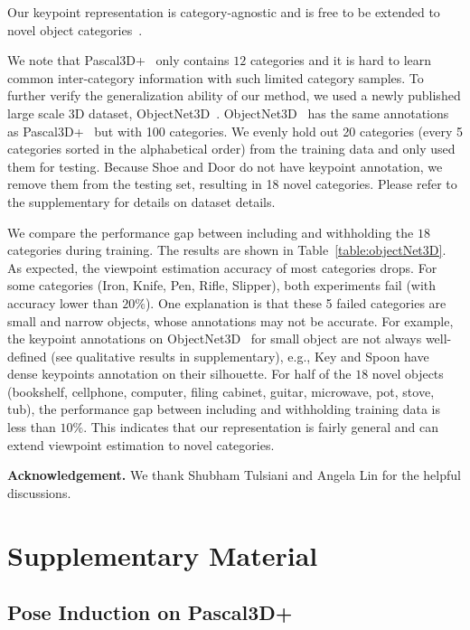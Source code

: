 \documentclass[runningheads]{llncs}
\begin{document}
Our keypoint representation is category-agnostic and is free to be extended to novel object categories~\cite{tulsiani2015pose}.

We note that Pascal3D+~\cite{xiang2014beyond} only contains $12$ categories and it is hard to learn common inter-category information with such limited category samples. 
To further verify the generalization ability of our method, we used a newly published large scale 3D dataset, ObjectNet3D~\cite{xiang2016objectnet3d}.
ObjectNet3D~\cite{xiang2016objectnet3d} has the same annotations as Pascal3D+~\cite{xiang2014beyond} but with 100 categories.
We evenly hold out 20 categories (every 5 categories sorted in the alphabetical order) from the training data and only used them for testing. Because Shoe and Door do not have keypoint annotation, we remove them from the testing set, resulting in 18 novel categories. Please refer to the supplementary for details on dataset details.


We compare the performance gap between including and withholding the $18$ categories during training. 
The results are shown in Table~\ref{table:objectNet3D}. 
As expected, the viewpoint estimation accuracy of most categories drops.
For some categories (Iron, Knife, Pen, Rifle, Slipper), both experiments fail (with accuracy lower than $20\%$). One explanation is that these 5 failed categories are small and narrow objects, whose annotations may not be accurate. For example, the keypoint annotations on ObjectNet3D~\cite{xiang2016objectnet3d} for small object are not always well-defined (see qualitative results in supplementary),
e.g., Key and Spoon have dense keypoints annotation on their silhouette.
For half of the $18$ novel objects (bookshelf, cellphone, computer, filing cabinet, guitar, microwave, pot, stove, tub), the performance gap between including and withholding training data is less than $10\%$.
This indicates that our representation is fairly general and can extend viewpoint estimation to novel categories.

 \noindent\textbf{Acknowledgement.} We thank Shubham Tulsiani and Angela Lin for the helpful discussions.  



\clearpage
\section{Supplementary Material}

\subsection{Pose Induction on Pascal3D+}
\end{document}
